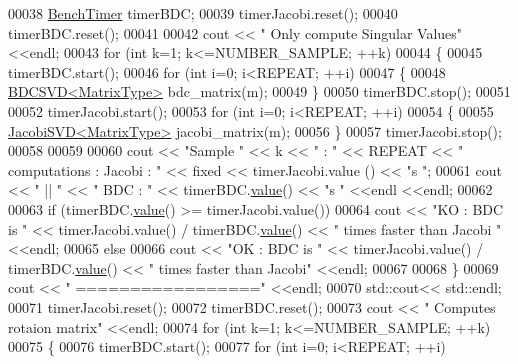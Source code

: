 \begin{DoxyCode}
00038   \hyperlink{class_eigen_1_1_bench_timer}{BenchTimer} timerBDC;
00039   timerJacobi.reset();
00040   timerBDC.reset();
00041 
00042   cout << \textcolor{stringliteral}{" Only compute Singular Values"} <<endl;
00043   \textcolor{keywordflow}{for} (\textcolor{keywordtype}{int} k=1; k<=NUMBER\_SAMPLE; ++k)
00044   \{
00045     timerBDC.start();
00046     \textcolor{keywordflow}{for} (\textcolor{keywordtype}{int} i=0; i<REPEAT; ++i) 
00047     \{
00048       \hyperlink{group___s_v_d___module_class_eigen_1_1_b_d_c_s_v_d}{BDCSVD<MatrixType>} bdc\_matrix(m);
00049     \}
00050     timerBDC.stop();
00051     
00052     timerJacobi.start();
00053     \textcolor{keywordflow}{for} (\textcolor{keywordtype}{int} i=0; i<REPEAT; ++i) 
00054     \{
00055       \hyperlink{group___s_v_d___module_class_eigen_1_1_jacobi_s_v_d}{JacobiSVD<MatrixType>} jacobi\_matrix(m);
00056     \}
00057     timerJacobi.stop();
00058 
00059 
00060     cout << \textcolor{stringliteral}{"Sample "} << k << \textcolor{stringliteral}{" : "} << REPEAT << \textcolor{stringliteral}{" computations :  Jacobi : "} << fixed << timerJacobi.value
      () << \textcolor{stringliteral}{"s "};
00061     cout << \textcolor{stringliteral}{" || "} << \textcolor{stringliteral}{" BDC : "} << timerBDC.\hyperlink{class_eigen_1_1_bench_timer_a26760f963ed8b64c126159bfea57735e}{value}() << \textcolor{stringliteral}{"s "} <<endl <<endl;
00062       
00063     \textcolor{keywordflow}{if} (timerBDC.\hyperlink{class_eigen_1_1_bench_timer_a26760f963ed8b64c126159bfea57735e}{value}() >= timerJacobi.value())  
00064       cout << \textcolor{stringliteral}{"KO : BDC is "} <<  timerJacobi.value() / timerBDC.\hyperlink{class_eigen_1_1_bench_timer_a26760f963ed8b64c126159bfea57735e}{value}() << \textcolor{stringliteral}{"  times faster than Jacobi
      "} <<endl;
00065     \textcolor{keywordflow}{else} 
00066       cout << \textcolor{stringliteral}{"OK : BDC is "} << timerJacobi.value() / timerBDC.\hyperlink{class_eigen_1_1_bench_timer_a26760f963ed8b64c126159bfea57735e}{value}() << \textcolor{stringliteral}{"  times faster than Jacobi"}
        <<endl;
00067       
00068   \}
00069   cout << \textcolor{stringliteral}{"       ================="} <<endl;
00070   std::cout<< std::endl;
00071   timerJacobi.reset();
00072   timerBDC.reset();
00073   cout << \textcolor{stringliteral}{" Computes rotaion matrix"} <<endl;
00074   \textcolor{keywordflow}{for} (\textcolor{keywordtype}{int} k=1; k<=NUMBER\_SAMPLE; ++k)
00075   \{
00076     timerBDC.start();
00077     \textcolor{keywordflow}{for} (\textcolor{keywordtype}{int} i=0; i<REPEAT; ++i) 

\end{DoxyCode}
